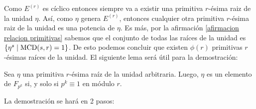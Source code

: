 Como $E^{(r)}$ es cíclico entonces siempre va a existir una primitiva $r$-ésima raiz de la unidad $\eta$. 
Así, como $\eta$ genera $E^{(r)}$, entonces cualquier otra primitiva $r$-ésima raiz de la unidad es una potencia de $\eta$. Es más, por la afirmación \ref{afirmacion relacion primitivas} sabemos que el conjunto de todas las raíces de la unidad es $\{\eta^{s}\mid {\rm MCD}(s,r)=1\}$.
De esto podemos concluir que existen $\phi (r)$ primitivas $r$-ésimas raí­ces de la unidad.
	El siguiente lema será útil para la demostración:
	
	\begin{lemma} 
          
		Sea $\eta$ una primitiva $r$-ésima raí­z de la unidad arbitraria. Luego, $\eta$ es un elemento de $ F_{p^k} $ si, y solo si $ p^k\equiv 1$ en módulo $r$.
	\end{lemma}
	La demostración se hará en 2 pasos:
